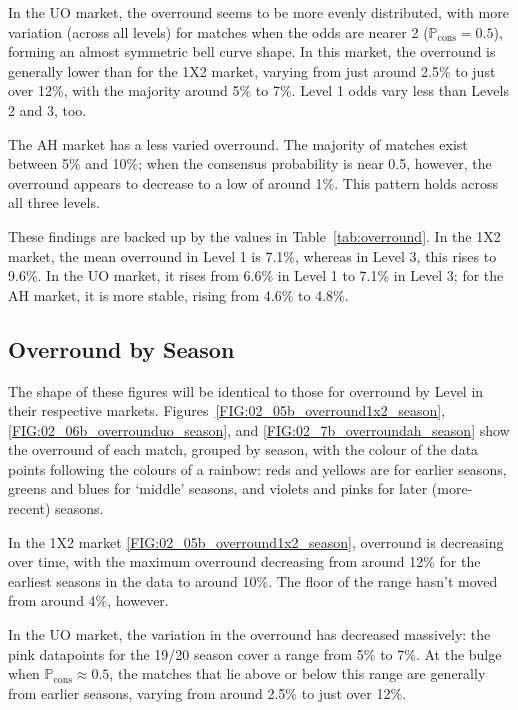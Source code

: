 \documentclass[a4paper,10pt]{report}
\begin{document}
In the UO market, the overround seems to be more evenly distributed, with more variation (across all levels) for matches when the odds are nearer 2 ($\mathbb{P}_{\textrm{cons}} = 0.5$), forming an almost symmetric bell curve shape. In this market, the overround is generally lower than for the 1X2 market, varying from just around 2.5\% to just over 12\%, with the majority around 5\% to 7\%. Level 1 odds vary less than Levels 2 and 3, too. \vspace{3mm}

The AH market has a less varied overround. The majority of matches exist between 5\% and 10\%; when the consensus probability is near 0.5, however, the overround appears to decrease to a low of around 1\%. This pattern holds across all three levels.\vspace{3mm}

These findings are backed up by the values in Table~\ref{tab:overround}. In the 1X2 market, the mean overround in Level 1 is 7.1\%, whereas in Level 3, this rises to 9.6\%. In the UO market, it rises from 6.6\% in Level 1 to 7.1\% in Level 3; for the AH market, it is more stable, rising from 4.6\% to 4.8\%.

\subsection*{Overround by Season}
The shape of these figures will be identical to those for overround by Level in their respective markets. Figures~\ref{FIG:02_05b_overround1x2_season}, \ref{FIG:02_06b_overrounduo_season}, and \ref{FIG:02_7b_overroundah_season} show the overround of each match, grouped by season, with the colour of the data points following the colours of a rainbow: reds and yellows are for earlier seasons, greens and blues for `middle' seasons, and violets and pinks for later (more-recent) seasons. \vspace{3mm}

In the 1X2 market \ref{FIG:02_05b_overround1x2_season}, overround is decreasing over time, with the maximum overround decreasing from around 12\% for the earliest seasons in the data to around 10\%. The floor of the range hasn't moved from around 4\%, however.\vspace{3mm}

In the UO market, the variation in the overround has decreased massively: the pink datapoints for the 19/20 season cover a range from 5\% to 7\%. At the bulge when $\mathbb{P}_{\textrm{cons}}\approx0.5$, the matches that lie above or below this range are generally from earlier seasons, varying from around 2.5\% to just over 12\%. \vspace{3mm}
\end{document}
